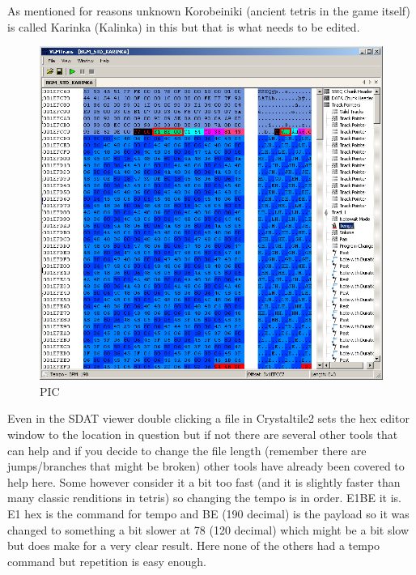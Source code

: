 \documentclass[
]{book}
\begin{document}
As mentioned for reasons unknown Korobeiniki (ancient tetris in the game itself) is called Karinka (Kalinka) in this but that is what needs to be edited.

\begin{figure}
\centering
\includegraphics{images/158_home_fast6191_romhackingguide_unrenamed_fil___ders_romhackguideSDATSSEQedit_speedchange_1.png}
\caption{PIC}
\end{figure}

Even in the SDAT viewer double clicking a file in Crystaltile2 sets the hex editor window to the location in question but if not there are several other tools that can help and if you decide to change the file length (remember there are jumps/branches that might be broken) other tools have already been covered to help here. Some however consider it a bit too fast (and it is slightly faster than many classic renditions in tetris) so changing the tempo is in order. E1BE it is. E1 hex is the command for tempo and BE (190 decimal) is the payload so it was changed to something a bit slower at 78 (120 decimal) which might be a bit slow but does make for a very clear result. Here none of the others had a tempo command but repetition is easy enough.
\end{document}
